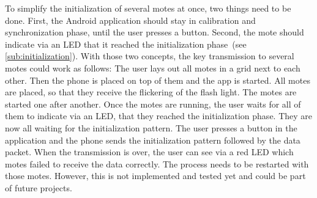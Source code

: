 \documentclass{sig-alternate} %
\begin{document}
To simplify the initialization of several motes at once, two things need to be done.
First, the Android application should stay in calibration and synchronization phase, until the user presses a button.
Second, the mote should indicate via an LED that it reached the initialization phase~(see \ref{sub:initialization}).
With those two concepts, the key transmission to several motes could work as follows:
The user lays out all motes in a grid next to each other.
Then the phone is placed on top of them and the app is started.
All motes are placed, so that they receive the flickering of the flash light.
The motes are started one after another.
Once the motes are running, the user waits for all of them to indicate via an LED, that they reached the initialization phase.
They are now all waiting for the initialization pattern.
The user presses a button in the application and the phone sends the initialization pattern followed by the data packet.
When the transmission is over, the user can see via a red LED which motes failed to receive the data correctly.
The process needs to be restarted with those motes.
However, this is not implemented and tested yet and could be part of future projects.



\end{document}

